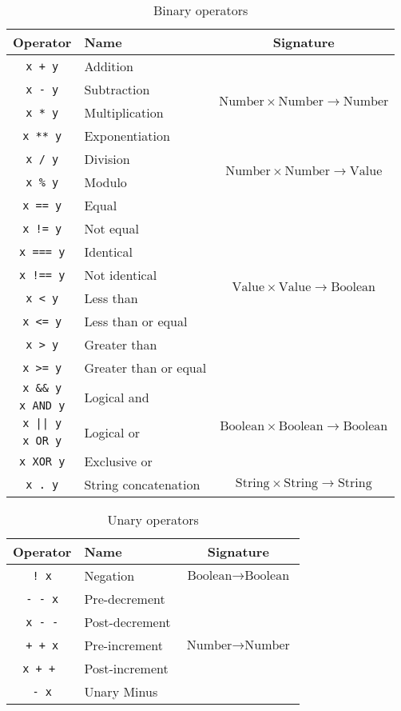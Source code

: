 \begin{table}
\centering
\begin{tabular}{c|l |c}\hline
Operator & Name & Signature\\
\hline\hline

\texttt{x + y} & Addition & \multirow{4}{*}{$ \text{Number} \times \text{Number} \rightarrow \text{Number}$} \\
\texttt{x - y} & Subtraction & \\
\texttt{x * y} & Multiplication & \\
\texttt{x ** y} & Exponentiation & \\\hline
\texttt{x / y} & Division &  \multirow{2}{*}{$ \text{Number} \times \text{Number} \rightarrow \text{Value}$}\\
\texttt{x \% y} & Modulo & \\\hline
\texttt{x == y} & Equal & \multirow{8}{*}{$ \text{Value} \times \text{Value} \rightarrow \text{Boolean}$} \\
\texttt{x != y} & Not equal & \\
\texttt{x === y} & Identical & \\
\texttt{x !== y} & Not identical & \\
\texttt{x < y} & Less than &\\
\texttt{x <= y} & Less than or equal & \\
\texttt{x > y} & Greater than & \\
\texttt{x >= y} & Greater than or equal &\\\hline
\texttt{x \&\& y} & \multirow{2}{*}{Logical and } & \multirow{5}{*}{ $ \text{Boolean} \times \text{Boolean} \rightarrow \text{Boolean}$} \\
\texttt{x AND y} & \\
\texttt{x || y} &  \multirow{2}{*}{Logical or } & \\
\texttt{x OR y} & \\
\texttt{x XOR y} & Exclusive or & \\\hline
\texttt{x . y} & String concatenation & $ \text{String} \times \text{String} \rightarrow \text{String}$ \\\hline
\end{tabular}
\caption{Binary operators\label{tab:binop}}
\end{table}

\begin{table}
\centering
\begin{tabular}{c|l |c}\hline
Operator & Name & Signature\\
\hline\hline
\texttt{! x} & Negation & $\text{Boolean} \rightarrow \text{Boolean}$\\\hline
\texttt{- - x} & Pre-decrement & \multirow{5}{*}{ $\text{Number} \rightarrow \text{Number}$}\\
\texttt{x - -} & Post-decrement & \\
\texttt{+ + x} & Pre-increment &\\
\texttt{x + + } & Post-increment & \\
\texttt{- x} & Unary Minus & \\\hline
\end{tabular}
\caption{Unary operators\label{tab:unop}}
\end{table}

